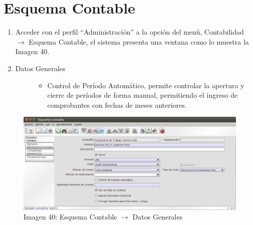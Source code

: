 \documentclass[letterpaper,10pt,spanish]{sphinxmanual}
\begin{document}
\section{Esquema Contable}
\label{contabilidad:esquema-contable}\begin{enumerate}
\item {} 
Acceder con el perfil ``Administración'' a la opción del menú, Contabilidad \(\rightarrow\)  Esquema Contable, el sistema presenta una ventana como lo muestra la Imagen 40.

\item {} \begin{description}
\item[{Datos Generales}] \leavevmode\begin{itemize}
\item {} 
Control de Período Automático, permite controlar la apertura y cierre de períodos de forma manual, permitiendo el ingreso de comprobantes con fechas de meses anteriores.

\end{itemize}

\end{description}

\end{enumerate}
\begin{figure}[htbp]
\centering
\capstart

\includegraphics{ly_contabilidad_40.png}
\caption{Imagen 40: Esquema Contable \(\rightarrow\) Datos Generales}\end{figure}
\end{document}
